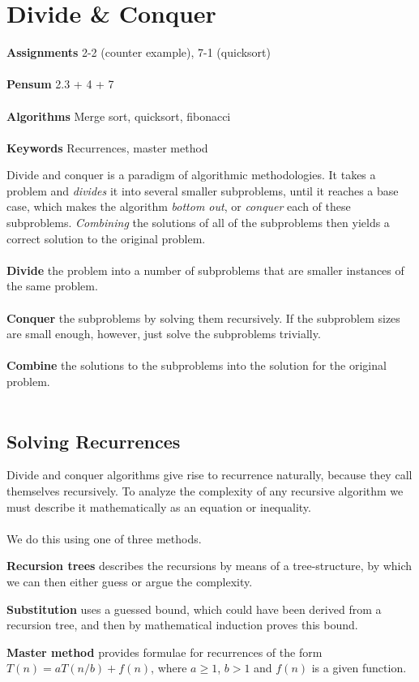 
\chapter{Divide \& Conquer}
\label{ch:divideandconquer}

\textbf{Assignments} 2-2 (counter example), 7-1 (quicksort)\\\\
\textbf{Pensum} 2.3 + 4 + 7 \cite{clrs} \\\\
\textbf{Algorithms} Merge sort, quicksort, fibonacci\\\\
\textbf{Keywords} Recurrences, master method
\vspace{1in}

\noindent Divide and conquer is a paradigm of algorithmic methodologies. It
takes a problem and \textit{divides} it into several smaller subproblems,
until it reaches a base case, which makes the algorithm \textit{bottom out},
or \textit{conquer} each of these subproblems. \textit{Combining} the
solutions of all of the subproblems then yields a correct solution to the
original problem.
\\\\
\noindent \textbf{Divide} the problem into a number of subproblems that are
smaller instances of the same problem.
\\\\
\noindent \textbf{Conquer} the subproblems by solving them recursively. If the
subproblem sizes are small enough, however, just solve the subproblems
trivially.
\\\\
\noindent \textbf{Combine} the solutions to the subproblems into the solution
for the original problem.
\\\\

\section{Solving Recurrences}
Divide and conquer algorithms give rise to recurrence naturally, because they
call themselves recursively. To analyze the complexity of any recursive
algorithm we must describe it mathematically as an equation or inequality.
\\\\
We do this using one of three methods.
\begin{description}
	\item \textbf{Recursion trees} describes the recursions by means of a
tree-structure, by which we can then either guess or argue the complexity.
	\item \textbf{Substitution} uses a guessed bound, which could have been
derived from a recursion tree, and then by mathematical induction proves this
bound.
	\item \textbf{Master method} provides formulae for recurrences of the form
$T(n) = a T(n/b) + f(n)$, where $a \geq 1$, $b > 1$ and $f(n)$ is a given
function.
\end{description}

